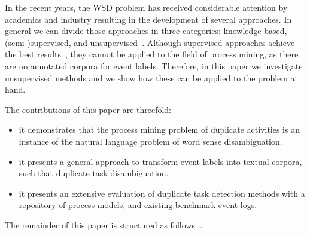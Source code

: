 In the recent years, the WSD problem has received considerable attention by academics and industry resulting in the development of several approaches. In general we can divide those approaches in three categories: knowledge-based, (semi-)supervised, and unsupervised~\cite{DBLP:journals/csur/Navigli09}. Although supervised approaches achieve the best results~\cite{iacobacci2016embeddings}, they cannot be applied to the field of process mining, as there are no annotated corpora for event labels. Therefore, in this paper we investigate unsupervised methods and we show how these can be applied to the problem at hand. 


The contributions of this paper are threefold:
\begin{itemize}
	\item it demonstrates that the process mining problem of duplicate activities is an instance of the natural language problem of word sense disambiguation.
	\item it presents a general approach to transform event labels into textual corpora, such that duplicate task disambiguation.
	\item it presents an extensive evaluation of duplicate task detection methods with a repository of process models, and existing benchmark event logs.
\end{itemize}

The remainder of this paper is structured as follows \ldots